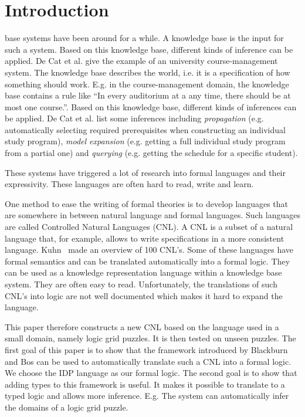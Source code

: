 \section{Introduction}

 base systems have been around for a while. A knowledge base is the input for such a system. Based on this knowledge base, different kinds of inference can be applied. De Cat et al. \cite{IDP} give the example of an university course-management system. The knowledge base describes the world, i.e. it is a specification of how something should work. E.g. in the course-management domain, the knowledge base contains a rule like ``In every auditorium at a any time, there should be at most one course.''. Based on this knowledge base, different kinds of inferences can be applied. De Cat et al. list some inferences including \textit{propagation} (e.g. automatically selecting required prerequisites when constructing an individual study program), \textit{model expansion} (e.g. getting a full individual study program from a partial one) and \textit{querying} (e.g. getting the schedule for a specific student).

These systems have triggered a lot of research into formal languages and their expressivity. These languages are often hard to read, write and learn.

One method to ease the writing of formal theories is to develop languages that are somewhere in between natural language and formal languages. Such languages are called Controlled Natural Languages (CNL). A CNL is a subset of a natural language that, for example, allows to write specifications in a more consistent language. Kuhn~\cite{Kuhn2014} made an overview of 100 CNL's. Some of these languages have formal semantics and can be translated automatically into a formal logic. They can be used as a knowledge representation language within a knowledge base system. They are often easy to read. Unfortunately, the translations of such CNL's into logic are not well documented which makes it hard to expand the language.

This paper therefore constructs a new CNL based on the language used in a small domain, namely logic grid puzzles. It is then tested on unseen puzzles. The first goal of this paper is to show that the framework introduced by Blackburn and Bos \cite{Blackburn2005, Blackburn2006} can be used to automatically translate such a CNL into a formal logic. We choose the IDP language \cite{IDP} as our formal logic. The second goal is to show that adding types to this framework is useful. It makes it possible to translate to a typed logic and allows more inference. E.g. The system can automatically infer the domains of a logic grid puzzle.

